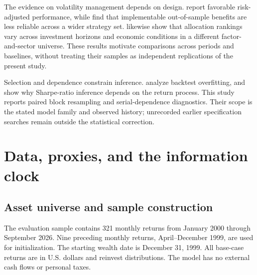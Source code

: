 \documentclass[12pt,letterpaper]{article}
\begin{document}
The evidence on volatility management depends on design. \citet{moreira2017} report favorable risk-adjusted performance, while \citet{cederburg2020} find that implementable out-of-sample benefits are less reliable across a wider strategy set. \citet{bessler2021} likewise show that allocation rankings vary across investment horizons and economic conditions in a different factor-and-sector universe. These results motivate comparisons across periods and baselines, without treating their samples as independent replications of the present study.

Selection and dependence constrain inference. \citet{bailey2017} analyze backtest overfitting, and \citet{lo2002} show why Sharpe-ratio inference depends on the return process. This study reports paired block resampling and serial-dependence diagnostics. Their scope is the stated model family and observed history; unrecorded earlier specification searches remain outside the statistical correction.

\section{Data, proxies, and the information clock}
\subsection{Asset universe and sample construction}
The evaluation sample contains 321 monthly returns from January 2000 through September 2026. Nine preceding monthly returns, April--December 1999, are used for initialization. The starting wealth date is December 31, 1999. All base-case returns are in U.S. dollars and reinvest distributions. The model has no external cash flows or personal taxes.
\end{document}
